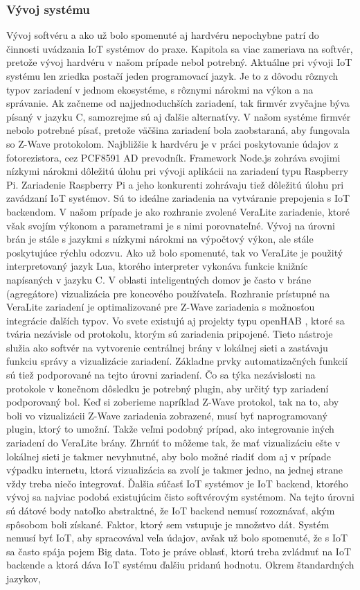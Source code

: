 \subsubsection{Vývoj systému}
Vývoj softvéru a ako už bolo spomenuté aj hardvéru nepochybne patrí do činnosti uvádzania IoT systémov do praxe. Kapitola sa viac zameriava na softvér, pretože vývoj hardvéru v našom prípade nebol potrebný. Aktuálne pri vývoji IoT systému len zriedka postačí jeden programovací jazyk. Je to z dôvodu rôznych typov zariadení v jednom ekosystéme, s rôznymi nárokmi na výkon a na správanie. Ak začneme od najjednoduchších zariadení, tak firmvér zvyčajne býva písaný v jazyku C, samozrejme sú aj ďalšie alternatívy. V našom systéme firmvér nebolo potrebné písať, pretože väčšina zariadení bola zaobstaraná, aby fungovala so Z-Wave protokolom. Najbližšie k hardvéru je v práci poskytovanie údajov z fotorezistora, cez PCF8591 AD prevodník. Framework Node.js zohráva svojimi nízkymi nárokmi dôležitú úlohu pri vývoji aplikácii na zariadení typu Raspberry Pi. Zariadenie Raspberry Pi a jeho konkurenti zohrávaju tiež dôležitú úlohu pri zavádzaní IoT systémov. Sú to ideálne zariadenia na vytváranie prepojenia s IoT backendom. V našom prípade je ako rozhranie zvolené VeraLite zariadenie, ktoré však svojím výkonom a parametrami je s nimi porovnateľné. Vývoj na úrovni brán je stále s jazykmi s nízkymi nárokmi na výpočtový výkon, ale stále poskytujúce rýchlu odozvu. Ako už bolo spomenuté, tak vo VeraLite je použitý interpretovaný jazyk Lua, ktorého interpreter vykonáva funkcie knižníc napísaných v jazyku C. V oblasti inteligentných domov je často v bráne (agregátore) vizualizácia pre koncového používateľa. Rozhranie prístupné na VeraLite zariadení je optimalizované pre Z-Wave zariadenia s možnosťou integrácie ďalších typov. Vo svete existujú aj projekty typu openHAB \cite{IOT32}, ktoré sa tvária nezávisle od protokolu, ktorým sú zariadenia pripojené. Tieto nástroje služia ako softvér na vytvorenie centrálnej brány v lokálnej sieti a zastávaju funkciu správy a vizualizácie zariadení. Základne prvky automatizačných funkcií sú tiež podporované na tejto úrovni zariadení. Čo sa týka nezávislosti na protokole v konečnom dôsledku je potrebný plugin, aby určitý typ zariadení podporovaný bol. Keď si zoberieme napríklad Z-Wave protokol, tak na to, aby boli vo vizualizácii Z-Wave zariadenia zobrazené, musí byť naprogramovaný plugin, ktorý to umožní. Takže veľmi podobný prípad, ako integrovanie iných zariadení do VeraLite brány. Zhrnúť to môžeme tak, že mať vizualizáciu ešte v lokálnej sieti je takmer nevyhnutné, aby bolo možné riadiť dom aj v prípade výpadku internetu, ktorá vizualizácia sa zvolí je takmer jedno, na jednej strane vždy treba niečo integrovať. Ďalšia súčasť IoT systémov je IoT backend, ktorého vývoj sa najviac podobá existujúcim čisto softvérovým systémom. Na tejto úrovni sú dátové body natoľko abstraktné, že IoT backend nemusí rozoznávať, akým spôsobom boli získané. Faktor, ktorý sem vstupuje je množstvo dát. Systém nemusí byť IoT, aby spracovával veľa údajov, avšak už bolo spomenuté, že s IoT sa často spája pojem Big data. Toto je práve oblasť, ktorú treba zvládnuť na IoT backende a ktorá dáva IoT systému ďalšiu pridanú hodnotu. Okrem štandardných jazykov, 
